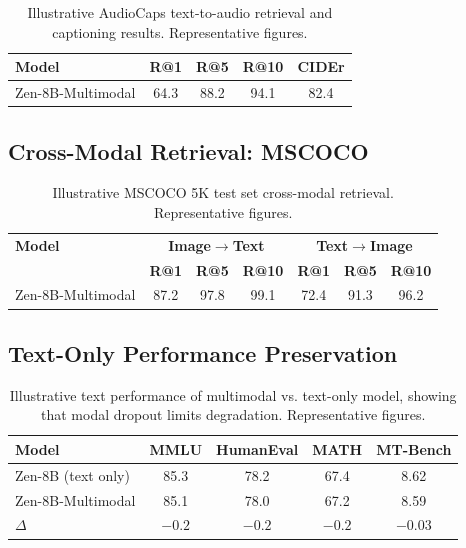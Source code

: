 \documentclass[11pt,a4paper]{article}
\begin{document}
\begin{table}[H]
\centering
\begin{tabular}{lcccc}
\toprule
\textbf{Model} & \textbf{R@1} & \textbf{R@5} & \textbf{R@10} & \textbf{CIDEr} \\
\midrule
Zen-8B-Multimodal & 64.3 & 88.2 & 94.1 & 82.4 \\
\bottomrule
\end{tabular}
\caption{Illustrative AudioCaps text-to-audio retrieval and captioning results. Representative figures.}
\end{table}

\subsection{Cross-Modal Retrieval: MSCOCO}

\begin{table}[H]
\centering
\begin{tabular}{lcccccc}
\toprule
\textbf{Model} & \multicolumn{3}{c}{\textbf{Image$\to$Text}} & \multicolumn{3}{c}{\textbf{Text$\to$Image}} \\
& \textbf{R@1} & \textbf{R@5} & \textbf{R@10} & \textbf{R@1} & \textbf{R@5} & \textbf{R@10} \\
\midrule
Zen-8B-Multimodal & 87.2 & 97.8 & 99.1 & 72.4 & 91.3 & 96.2 \\
\bottomrule
\end{tabular}
\caption{Illustrative MSCOCO 5K test set cross-modal retrieval. Representative figures.}
\end{table}

\subsection{Text-Only Performance Preservation}

\begin{table}[H]
\centering
\begin{tabular}{lcccc}
\toprule
\textbf{Model} & \textbf{MMLU} & \textbf{HumanEval} & \textbf{MATH} & \textbf{MT-Bench} \\
\midrule
Zen-8B (text only) & 85.3 & 78.2 & 67.4 & 8.62 \\
Zen-8B-Multimodal & 85.1 & 78.0 & 67.2 & 8.59 \\
$\Delta$ & $-0.2$ & $-0.2$ & $-0.2$ & $-0.03$ \\
\bottomrule
\end{tabular}
\caption{Illustrative text performance of multimodal vs. text-only model, showing that modal dropout limits degradation. Representative figures.}
\end{table}
\end{document}
